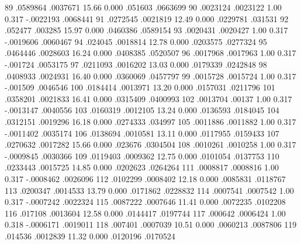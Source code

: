          89  {\VBAR}   .0589864   .0037671    15.66   0.000      .051603    .0663699
         90  {\VBAR}   .0023124   .0023122     1.00   0.317    -.0022193    .0068441
         91  {\VBAR}   .0272545   .0021819    12.49   0.000     .0229781     .031531
         92  {\VBAR}    .052477    .003285    15.97   0.000     .0460386    .0589154
         93  {\VBAR}   .0020431   .0020427     1.00   0.317    -.0019606    .0060467
         94  {\VBAR}    .024045   .0018814    12.78   0.000     .0203575    .0277324
         95  {\VBAR}   .0464446   .0028603    16.24   0.000     .0408385    .0520507
         96  {\VBAR}   .0017968   .0017963     1.00   0.317     -.001724    .0053175
         97  {\VBAR}   .0211093   .0016202    13.03   0.000     .0179339    .0242848
         98  {\VBAR}   .0408933   .0024931    16.40   0.000     .0360069    .0457797
         99  {\VBAR}   .0015728   .0015724     1.00   0.317     -.001509    .0046546
        100  {\VBAR}   .0184414   .0013971    13.20   0.000     .0157031    .0211796
        101  {\VBAR}   .0358201   .0021833    16.41   0.000     .0315409    .0400993
        102  {\VBAR}   .0013704     .00137     1.00   0.317    -.0013147    .0040556
        103  {\VBAR}   .0160319   .0012105    13.24   0.000     .0136593    .0184045
        104  {\VBAR}   .0312151   .0019296    16.18   0.000     .0274333     .034997
        105  {\VBAR}   .0011886   .0011882     1.00   0.317    -.0011402    .0035174
        106  {\VBAR}   .0138694   .0010581    13.11   0.000     .0117955    .0159433
        107  {\VBAR}   .0270632   .0017282    15.66   0.000      .023676    .0304504
        108  {\VBAR}   .0010261   .0010258     1.00   0.317    -.0009845    .0030366
        109  {\VBAR}   .0119403   .0009362    12.75   0.000     .0101054    .0137753
        110  {\VBAR}   .0233443   .0015725    14.85   0.000     .0202623    .0264264
        111  {\VBAR}   .0008817   .0008816     1.00   0.317    -.0008462    .0026096
        112  {\VBAR}   .0102299   .0008402    12.18   0.000     .0085831    .0118767
        113  {\VBAR}   .0200347   .0014533    13.79   0.000     .0171862    .0228832
        114  {\VBAR}   .0007541   .0007542     1.00   0.317    -.0007242    .0022324
        115  {\VBAR}   .0087222   .0007646    11.41   0.000     .0072235    .0102208
        116  {\VBAR}    .017108   .0013604    12.58   0.000     .0144417    .0197744
        117  {\VBAR}    .000642   .0006424     1.00   0.318    -.0006171    .0019011
        118  {\VBAR}    .007401   .0007039    10.51   0.000     .0060213    .0087806
        119  {\VBAR}    .014536   .0012839    11.32   0.000     .0120196    .0170524
